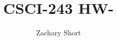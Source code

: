 \documentclass{article}
\title{CSCI-243 HW-}
\author{Zachary Short}
\begin{document}
\maketitle

\section{}
    \subsection{}
    \subsection{}
\section{}
    \subsection{ }
    \subsection{ }
\section{}
    \subsection{} 
    \subsection{} 
\section{}
    \subsection{}
    \subsection{}
\end{document}
